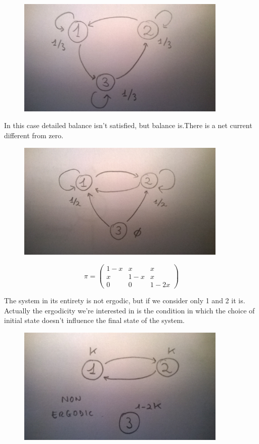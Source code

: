\documentclass[a4paper, italian, openany]{book}
\begin{document}
\begin{itemize}
\begin{figure}[H]
\centering
\includegraphics[width=100mm]{img/pic14.jpg}
\end{figure}

In this case detailed balance isn't satisfied, but balance is.There is a net current different from zero.

\begin{figure}[H]
\centering
\includegraphics[width=100mm]{img/pic15.jpg}
\end{figure}

$$\pi = \left ( \begin{array}{ccc} 1-x & x & x \\ x & 1-x & x \\ 0 & 0 & 1-2x \end{array} \right )$$

The system in its entirety is not ergodic, but if we consider only 1 and 2 it is. Actually the ergodicity we're interested in is the condition in which the choice of initial state doesn't influence the final state of the system.

\begin{figure}[H]
\centering
\includegraphics[width=100mm]{img/pic16.jpg}
\end{figure}


\end{itemize}
\end{document}

